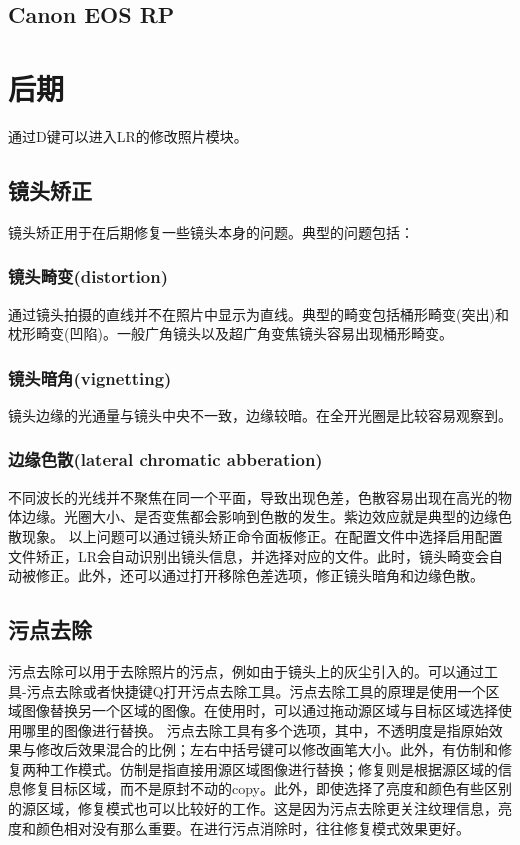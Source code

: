 \documentclass{ctexart}
\begin{document}
\subsection{Canon EOS RP}

\section{后期}
通过D键可以进入LR的修改照片模块。
\subsection{镜头矫正}
镜头矫正用于在后期修复一些镜头本身的问题。典型的问题包括：
\subsubsection{镜头畸变(distortion)}
通过镜头拍摄的直线并不在照片中显示为直线。典型的畸变包括桶形畸变(突出)和枕形畸变(凹陷)。一般广角镜头以及超广角变焦镜头容易出现桶形畸变。
\subsubsection{镜头暗角(vignetting)}
镜头边缘的光通量与镜头中央不一致，边缘较暗。在全开光圈是比较容易观察到。
\subsubsection{边缘色散(lateral chromatic abberation)}
不同波长的光线并不聚焦在同一个平面，导致出现色差，色散容易出现在高光的物体边缘。光圈大小、是否变焦都会影响到色散的发生。紫边效应就是典型的边缘色散现象。
以上问题可以通过镜头矫正命令面板修正。在配置文件中选择启用配置文件矫正，LR会自动识别出镜头信息，并选择对应的文件。此时，镜头畸变会自动被修正。此外，还可以通过打开移除色差选项，修正镜头暗角和边缘色散。
\subsection{污点去除}
污点去除可以用于去除照片的污点，例如由于镜头上的灰尘引入的。可以通过工具-污点去除或者快捷键Q打开污点去除工具。污点去除工具的原理是使用一个区域图像替换另一个区域的图像。在使用时，可以通过拖动源区域与目标区域选择使用哪里的图像进行替换。
污点去除工具有多个选项，其中，不透明度是指原始效果与修改后效果混合的比例；左右中括号键可以修改画笔大小。此外，有仿制和修复两种工作模式。仿制是指直接用源区域图像进行替换；修复则是根据源区域的信息修复目标区域，而不是原封不动的copy。此外，即使选择了亮度和颜色有些区别的源区域，修复模式也可以比较好的工作。这是因为污点去除更关注纹理信息，亮度和颜色相对没有那么重要。在进行污点消除时，往往修复模式效果更好。
\end{document}
